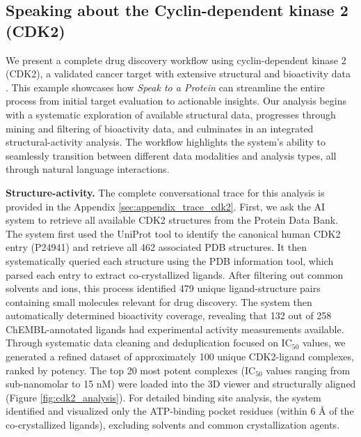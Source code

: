 \documentclass{article}
\begin{document}
\subsection{Speaking about the Cyclin-dependent kinase 2 (CDK2)}

We present a complete drug discovery workflow using cyclin-dependent kinase 2 (CDK2), a validated cancer target with extensive structural and bioactivity data \citep{Malumbres2009}. This example showcases how \emph{Speak to a Protein} can streamline the entire process from initial target evaluation to actionable insights.
Our analysis begins with a systematic exploration of available structural data, progresses through mining and filtering of bioactivity data, and culminates in an integrated structural-activity analysis. The workflow highlights the system's ability to seamlessly transition between different data modalities and analysis types, all through natural language interactions. 

\textbf{Structure-activity.} The complete conversational trace for this analysis is provided in the Appendix \ref{sec:appendix_trace_cdk2}. First, we ask the AI system to retrieve all available CDK2 structures from the Protein Data Bank. The system first used the UniProt tool to identify the canonical human CDK2 entry (P24941) and retrieve all 462 associated PDB structures. It then systematically queried each structure using the PDB information tool, which parsed each entry to extract co-crystallized ligands. After filtering out common solvents and ions, this process identified 479 unique ligand-structure pairs containing small molecules relevant for drug discovery.
The system then automatically determined bioactivity coverage, revealing that 132 out of 258 ChEMBL-annotated ligands had experimental activity measurements available. Through systematic data cleaning and deduplication focused on IC$_{50}$ values, we generated a refined dataset of approximately 100 unique CDK2-ligand complexes, ranked by potency.
The top 20 most potent complexes (IC$_{50}$ values ranging from sub-nanomolar to 15 nM) were loaded into the 3D viewer and structurally aligned (Figure \ref{fig:cdk2_analysis}). For detailed binding site analysis, the system identified and visualized only the ATP-binding pocket residues (within 6 \AA{} of the co-crystallized ligands), excluding solvents and common crystallization agents. 
\end{document}

